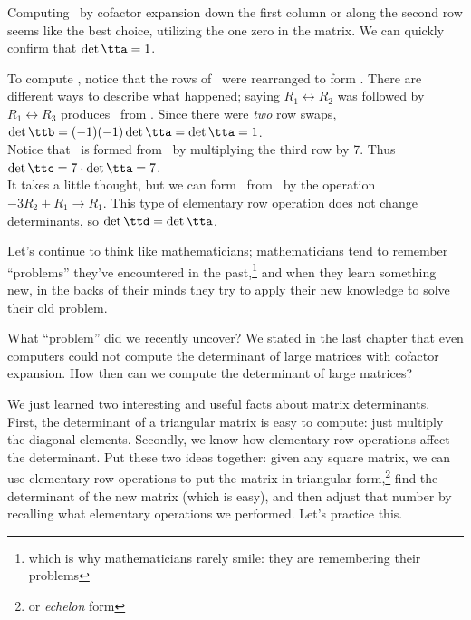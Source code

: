 {Computing \det{\tta}\ by cofactor expansion down the first column or along the second row seems like the best choice, utilizing the one zero in the matrix. We can quickly confirm that $\det{\tta} = 1$. 

To compute \det{\ttb}, notice that the rows of \tta\ were rearranged to form \ttb. There are different ways to describe what happened; saying $R_1\leftrightarrow R_2$ was followed by $R_1\leftrightarrow R_3$ produces \ttb\ from \tta. Since there were \textit{two} row swaps, $\det{\ttb} = (-1)(-1)\det{\tta} = \det{\tta} = 1$.\\ 

Notice that \ttc\ is formed from \tta\ by multiplying the third row by 7. Thus $\det{\ttc} = 7\cdot\det{\tta} = 7$.\\

It takes a little thought, but we can form \ttd\ from \tta\ by the operation $-3R_2+R_1\rightarrow R_1$. This type of elementary row operation does not change determinants, so $\det{\ttd} = \det{\tta}$.
} 

\medskip

Let's continue to think like mathematicians; mathematicians tend to remember ``problems'' they've encountered in the past,\footnote{which is why mathematicians rarely smile: they are remembering their problems} and when they learn something new, in the backs of their minds they try to apply their new knowledge to solve their old problem.

What ``problem'' did we recently uncover? We stated in the last chapter that even computers could not compute the determinant of large matrices with cofactor expansion. How then can we compute the determinant of large matrices?

We just learned two interesting and useful facts about matrix determinants. First, the determinant of a triangular matrix is easy to compute: just multiply the diagonal elements. Secondly, we know how elementary row operations affect the determinant. Put these two ideas together: given any square matrix, we can use elementary row operations to put the matrix in triangular form,\footnote{or {\em echelon} form} find the determinant of the new matrix (which is easy), and then adjust that number by recalling what elementary operations we performed. Let's practice this.

